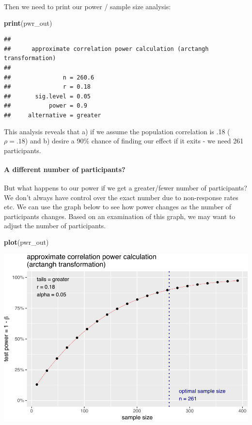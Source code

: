 \documentclass[
]{krantz}
\makeatletter
\newenvironment{Shaded}{\begin{snugshade}}{\end{snugshade}}
\newcommand{\KeywordTok}[1]{\textcolor[rgb]{0.27,0.27,0.27}{\textbf{#1}}}
\newcommand{\NormalTok}[1]{#1}
\newenvironment{kframe}{%
\medskip{}
\setlength{\fboxsep}{.8em}
 \def\at@end@of@kframe{}%
 \ifinner\ifhmode%
  \def\at@end@of@kframe{\end{minipage}}%
  \begin{minipage}{\columnwidth}%
 \fi\fi%
 \def\FrameCommand##1{\hskip\@totalleftmargin \hskip-\fboxsep
 \colorbox{shadecolor}{##1}\hskip-\fboxsep
     \hskip-\linewidth \hskip-\@totalleftmargin \hskip\columnwidth}%
 \MakeFramed {\advance\hsize-\width
   \@totalleftmargin\z@ \linewidth\hsize
   \@setminipage}}%
 {\par\unskip\endMakeFramed%
 \at@end@of@kframe}
\renewenvironment{Shaded}{\begin{kframe}}{\end{kframe}}
\makeatother
\begin{document}
Then we need to print our power / sample size analysis:

\begin{Shaded}
\begin{Highlighting}[]
\KeywordTok{print}\NormalTok{(pwr_out)}
\end{Highlighting}
\end{Shaded}

\begin{verbatim}
## 
##      approximate correlation power calculation (arctangh transformation) 
## 
##               n = 260.6
##               r = 0.18
##       sig.level = 0.05
##           power = 0.9
##     alternative = greater
\end{verbatim}

This analysis reveals that a) if we assume the population correlation is .18 (\(\rho = .18\)) and b) desire a 90\% chance of finding our effect if it exits - we need 261 participants.

\hypertarget{a-different-number-of-participants-2}{%
\paragraph{A different number of participants?}\label{a-different-number-of-participants-2}}

But what happens to our power if we get a greater/fewer number of participants? We don't always have control over the exact number due to non-response rates etc. We can use the graph below to see how power changes as the number of participants changes. Based on an examination of this graph, we may want to adjust the number of participants.

\begin{Shaded}
\begin{Highlighting}[]
\KeywordTok{plot}\NormalTok{(pwr_out)}
\end{Highlighting}
\end{Shaded}

\includegraphics{bookdown_files/figure-latex/unnamed-chunk-258-1.pdf}
\end{document}
